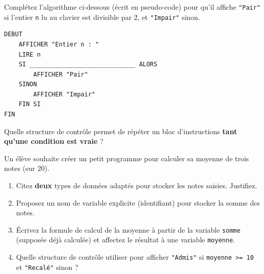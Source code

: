 \documentclass[11pt]{article}
\begin{document}
\begin{exercice}
Complétez l'algorithme ci-dessous (écrit en pseudo-code) pour qu'il affiche \texttt{"Pair"} si l'entier \texttt{n} lu au clavier est divisible par 2, et \texttt{"Impair"} sinon.
\begin{verbatim}
DEBUT
    AFFICHER "Entier n : "
    LIRE n
    SI _____________________________ ALORS
        AFFICHER "Pair"
    SINON
        AFFICHER "Impair"
    FIN SI
FIN
\end{verbatim}
\noindent Quelle structure de contrôle permet de répéter un bloc d'instructions \textbf{tant qu'une condition est vraie} ? \dotfill
\end{exercice}

\begin{exercice}
Un élève souhaite créer un petit programme pour calculer sa moyenne de trois notes (sur 20).
\begin{enumerate}
    \item Citez \textbf{deux} types de données adaptés pour stocker les notes saisies. Justifiez.
    \item Proposez un nom de variable explicite (identifiant) pour stocker la somme des notes.
    \item Écrivez la formule de calcul de la moyenne à partir de la variable \texttt{somme} (supposée déjà calculée) et affectez le résultat à une variable \texttt{moyenne}.
    \item Quelle structure de contrôle utiliser pour afficher \texttt{"Admis"} si \texttt{moyenne >= 10} et \texttt{"Recalé"} sinon ?
\end{enumerate}
\end{exercice}
\end{document}
